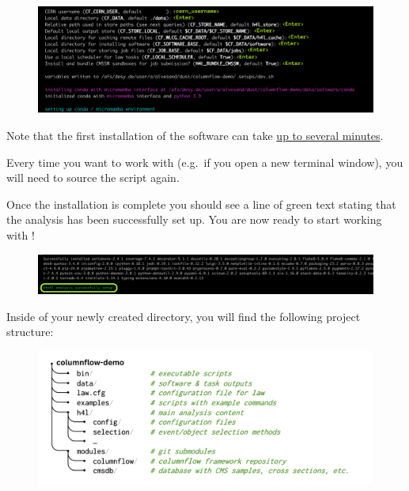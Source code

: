 \begin{figure}[!h]
    \centering
    \includegraphics[scale=0.62]{images/setup.png}
\end{figure}

Note that the first installation of the software can take \underline{up to several minutes}.

Every time you want to work with \columnflow (e.g.\ if you open a new terminal window), you will need to source the  script again.


Once the installation is complete you should see a line of green text stating that the analysis has been successfully set up. You are now ready to start working with \columnflow! 


\begin{figure}[!h]
    \centering
    \includegraphics[scale=0.62]{images/setup2.png}
\end{figure}

Inside of your newly created  directory, you will find the following project structure:
\begin{figure}[!h]
    \centering
    \includegraphics[scale=0.62]{images/CF_demo.png}
    \label{fig:directory_structure}
\end{figure}

